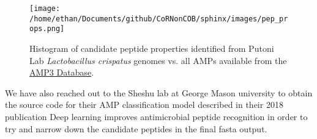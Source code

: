 \documentclass{article}
\begin{document}
\begin{figure}[h]
\centering
\texttt{[image: /home/ethan/Documents/github/CoRNonCOB/sphinx/images/pep\_props.png]}
\caption{Histogram of candidate peptide properties identified from Putoni Lab \emph{Lactobacillus crispatus} genomes vs. all AMPs available from the \href{http://aps.unmc.edu/AP/main.php}{AMP3 Database}.}
\end{figure}

We have also reached out to the Sheshu lab at George Mason university to obtain the source code for their AMP classification model described in their 2018 publication Deep learning improves antimicrobial peptide recognition in order to try and narrow down the candidate peptides in the final fasta output.\cite{duchrow_shtatland_guettler_pivovarov_kramer_weissleder_2009}

\newpage
{}

\end{document}
